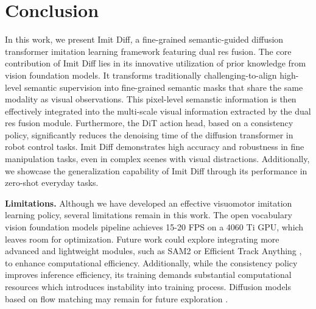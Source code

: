 


\section{Conclusion}
\label{Conclusion}

In this work, we present Imit Diff, a fine-grained semantic-guided diffusion transformer imitation learning framework featuring dual res fusion. The core contribution of Imit Diff lies in its innovative utilization of prior knowledge from vision foundation models. It transforms traditionally challenging-to-align high-level semantic supervision into fine-grained semantic masks that share the same modality as visual observations. This pixel-level semanstic information is then effectively integrated into the multi-scale visual information extracted by the dual res fusion module. Furthermore, the DiT action head, based on a consistency policy, significantly reduces the denoising time of the diffusion transformer in robot control tasks. Imit Diff demonstrates high accuracy and robustness in fine manipulation tasks, even in complex scenes with visual distractions. Additionally, we showcase the generalization capability of Imit Diff through its performance in zero-shot everyday tasks.

\textbf{Limitations. }Although we have developed an effective visuomotor imitation learning policy, several limitations remain in this work. The open vocabulary vision foundation models pipeline achieves 15-20 FPS on a 4060 Ti GPU, which leaves room for optimization. Future work could explore integrating more advanced and lightweight modules, such as SAM2 \citep{ravi2024sam} or Efficient Track Anything \citep{xiong2024efficient}, to enhance computational efficiency. Additionally, while the consistency policy improves inference efficiency, its training demands substantial computational resources which introduces instability into training process. Diffusion models based on flow matching may remain for future exploration \citep{lipman2022flow}.